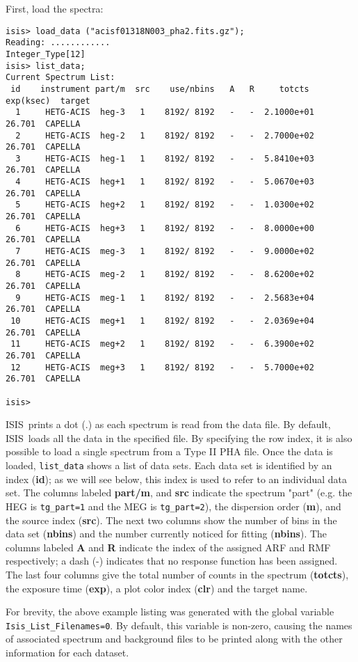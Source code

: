\documentclass{book}
\newcommand{\isisx}{{\sc ISIS~}}
\begin{document}
First, load the spectra:
\begin{verbatim}
isis> load_data ("acisf01318N003_pha2.fits.gz");
Reading: ............
Integer_Type[12]
isis> list_data;
Current Spectrum List:
 id    instrument part/m  src    use/nbins   A   R     totcts   exp(ksec)  target
  1     HETG-ACIS  heg-3   1    8192/ 8192   -   -  2.1000e+01    26.701  CAPELLA
  2     HETG-ACIS  heg-2   1    8192/ 8192   -   -  2.7000e+02    26.701  CAPELLA
  3     HETG-ACIS  heg-1   1    8192/ 8192   -   -  5.8410e+03    26.701  CAPELLA
  4     HETG-ACIS  heg+1   1    8192/ 8192   -   -  5.0670e+03    26.701  CAPELLA
  5     HETG-ACIS  heg+2   1    8192/ 8192   -   -  1.0300e+02    26.701  CAPELLA
  6     HETG-ACIS  heg+3   1    8192/ 8192   -   -  8.0000e+00    26.701  CAPELLA
  7     HETG-ACIS  meg-3   1    8192/ 8192   -   -  9.0000e+02    26.701  CAPELLA
  8     HETG-ACIS  meg-2   1    8192/ 8192   -   -  8.6200e+02    26.701  CAPELLA
  9     HETG-ACIS  meg-1   1    8192/ 8192   -   -  2.5683e+04    26.701  CAPELLA
 10     HETG-ACIS  meg+1   1    8192/ 8192   -   -  2.0369e+04    26.701  CAPELLA
 11     HETG-ACIS  meg+2   1    8192/ 8192   -   -  6.3900e+02    26.701  CAPELLA
 12     HETG-ACIS  meg+3   1    8192/ 8192   -   -  5.7000e+02    26.701  CAPELLA

isis>
\end{verbatim}
\isisx prints a dot (.) as each spectrum is read from the data
file.  By default, \isisx loads all the data in the specified
file.  By specifying the row index, it is also possible to load
a single spectrum from a Type II PHA file.  Once the data is
loaded, \verb|list_data| shows a list of data sets.  Each data
set is identified by an index ({\bf id}); as we will see below,
this index is used to refer to an individual data set.  The
columns labeled {\bf part/m}, and {\bf src} indicate the
spectrum "part" (e.g. the HEG is \verb|tg_part=1| and
the MEG is \verb|tg_part=2|), the dispersion order ({\bf m}), and
the source index ({\bf src}).  The next two columns show the
number of bins in the data set ({\bf nbins}) and the number
currently noticed for fitting ({\bf nbins}). The columns
labeled {\bf A} and {\bf R} indicate the index of the assigned
ARF and RMF respectively; a dash (-) indicates that no response
function has been assigned. The last four columns give the
total number of counts in the spectrum ({\bf totcts}), the
exposure time ({\bf exp}), a plot color index ({\bf clr}) and
the target name.

For brevity, the above example listing was generated with the
global variable \verb|Isis_List_Filenames=0|.  By default, this
variable is non-zero, causing the names of associated spectrum
and background files to be printed along with the other
information for each dataset.
\end{document}
